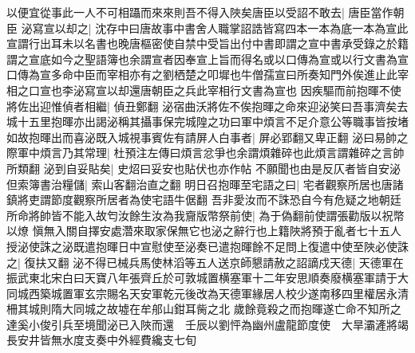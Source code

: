 以便宜從事此一人不可相躡而來來則吾不得入陜矣唐臣以受詔不敢去|{
	唐臣當作朝臣}
泌寫宣以却之|{
	沈存中曰唐故事中書舍人職掌詔誥皆寫四本一本為底一本為宣此宣謂行出耳未以名書也晚唐樞密使自禁中受旨出付中書即謂之宣中書承受錄之於籍謂之宣底如今之聖語簿也余謂宣者因奉宣上旨而得名或以口傳為宣或以行文書為宣口傳為宣多命中臣而宰相亦有之劉栖楚之叩墀也牛僧孺宣曰所奏知門外俟進止此宰相之口宣也李泌寫宣以却還唐朝臣之兵此宰相行文書為宣也}
因疾驅而前抱暉不使將佐出迎惟偵者相繼|{
	偵丑鄭翻}
泌宿曲沃將佐不俟抱暉之命來迎泌笑曰吾事濟矣去城十五里抱暉亦出謁泌稱其攝事保完城隍之功曰軍中煩言不足介意公等職事皆按堵如故抱暉出而喜泌既入城視事賓佐有請屏人白事者|{
	屏必郢翻又卑正翻}
泌曰易帥之際軍中煩言乃其常理|{
	杜預注左傳曰煩言忿爭也余謂煩雜碎也此煩言謂雜碎之言帥所類翻}
泌到自妥貼矣|{
	史炤曰妥安也貼伏也亦作帖}
不願聞也由是反仄者皆自安泌但索簿書治糧儲|{
	索山客翻治直之翻}
明日召抱暉至宅語之曰|{
	宅者觀察所居也唐諸鎮將吏謂節度觀察所居者為使宅語牛倨翻}
吾非愛汝而不誅恐自今有危疑之地朝廷所命將帥皆不能入故匄汝餘生汝為我齎版幣祭前使|{
	為于偽翻前使謂張勸版以祝幣以燎}
愼無入關自擇安處濳來取家保無它也泌之辭行也上籍陜將預于亂者七十五人授泌使誅之泌既遣抱暉日中宣慰使至泌奏已遣抱暉餘不足問上復遣中使至陜必使誅之|{
	復扶又翻}
泌不得已械兵馬使林滔等五人送京師懇請赦之詔謫戍天德|{
	天德軍在振武東北宋白曰天寶八年張齊丘於可敦城置横塞軍十二年安思順奏廢横塞軍請于大同城西築城置軍玄宗賜名天安軍乾元後改為天德軍緣居人校少遂南移四里權居永清柵其城則隋大同城之故墟在牟郍山鉗耳胔之北}
歲餘竟殺之而抱暉遂亡命不知所之達奚小俊引兵至境聞泌已入陜而還　壬辰以劉怦為幽州盧龍節度使　大旱灞滻將竭長安井皆無水度支奏中外經費纔支七旬

